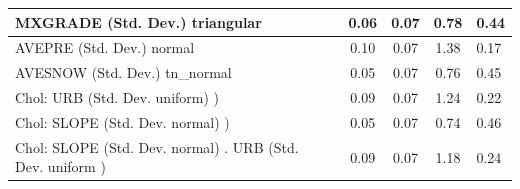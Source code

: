 \begin{table}
\begin{center}
\begin{tabular}{|l|l|c|c|c|l|}
			\hline
			MXGRADE (Std. Dev.) triangular &  & 0.06 & 0.07 & 0.78 & 0.44 \\
			\hline
			AVEPRE (Std. Dev.) normal &  & 0.10 & 0.07 & 1.38 & 0.17 \\
			\hline
			AVESNOW (Std. Dev.) tn_normal &  & 0.05 & 0.07 & 0.76 & 0.45 \\
			\hline
			 Chol: URB (Std. Dev. uniform) ) &  & 0.09 & 0.07 & 1.24 & 0.22 \\
			\hline
			 Chol: SLOPE (Std. Dev. normal) ) &  & 0.05 & 0.07 & 0.74 & 0.46 \\
			\hline
			 Chol: SLOPE (Std. Dev. normal) . URB (Std. Dev.   uniform ) &  & 0.09 & 0.07 & 1.18 & 0.24 \\
			\hline
		\end{tabular}
	\end{center}
\end{table}